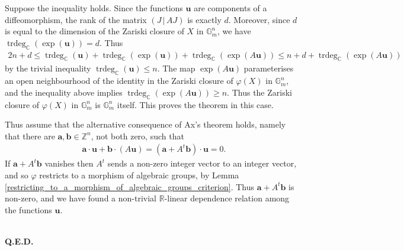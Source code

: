 \documentclass[9pt]{amsart}
\theoremstyle{my_theorem_style}
\numberwithin{definition}{section}
\renewenvironment{proof}{\noindent {\textbf{Proof.}}}{\\\textbf{Q.E.D.}}
\newcommand{\C}{\mathbb{C}}
\newcommand{\G}{\mathbb{G}}
\renewcommand{\phi}{\varphi}
\newcommand{\R}{\mathbb{R}}
\DeclareMathOperator{\trdeg}{trdeg}
\renewcommand{\vec}[1]{\bm{#1}}
\newcommand{\Z}{\mathbb{Z}}
\begin{document}
\begin{proof}
    Suppose the inequality holds. Since the functions $\vec{u}$ are components of a diffeomorphism, the rank of the matrix $(J \, | \, A J)$ is exactly $d$. Moreover, since $d$ is equal to the dimension of the Zariski closure of $X$ in $\G_m^n$, we have $\trdeg_\C(\exp(\vec{u})) = d$. Thus
    \begin{align*}
        2n + d \leq \trdeg_\C(\vec{u}) + 
        \trdeg_\C(\exp(\vec{u})) + 
        \trdeg_\C(\exp(A \vec{u}))
        \leq n + d + \trdeg_\C(\exp(A \vec{u}))
    \end{align*}
    by the trivial inequality $\trdeg_\C(\vec{u}) \leq n$. The map $\exp(A \vec{u})$ parameterises an open neighbourhood of the identity in the Zariski closure of $\phi(X)$ in $\G_m^n$, and the inequality above implies $\trdeg_\C(\exp(A\vec{u})) \geq n$. Thus the Zariski closure of $\phi(X)$ in $\G_m^n$ is $\G_m^n$ itself. This proves the theorem in this case.

    Thus assume that the alternative consequence of Ax's theorem holds, namely that there are $\vec{a}, \vec{b} \in \Z^n$, not both zero, such that
    \begin{align*}
        \vec{a} \cdot \vec{u} + \vec{b} \cdot (A\vec{u}) = (\vec{a} + A^t \vec{b}) \cdot \vec{u} = 0.
    \end{align*}
    If $\vec{a} + A^t \vec{b}$ vanishes then $A^t$ sends a non-zero integer vector to an integer vector, and so $\phi$ restricts to a morphism of algebraic groups, by Lemma \ref{restricting_to_a_morphism_of_algebraic_groups_criterion}. Thus $\vec{a} + A^t \vec{b}$ is non-zero, and we have found a non-trivial $\R$-linear dependence relation among the functions $\vec{u}$.
    

\end{proof}
\end{document}
